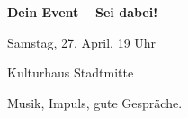 \documentclass[a5paper,12pt]{article}
\begin{document}
\begin{center}
  {\LARGE\bfseries Dein Event – Sei dabei!}
\end{center}

\vspace{1em}

\begin{multicols}{2}
  \begin{tcolorbox}[flyerstyle, title=Wann?]
    Samstag, 27. April, 19 Uhr
  \end{tcolorbox}

  \begin{tcolorbox}[flyerstyle, title=Wo?]
    Kulturhaus Stadtmitte
  \end{tcolorbox}

  \begin{tcolorbox}[flyerstyle, title=Was erwartet dich?]
    Musik, Impuls, gute Gespräche.
  \end{tcolorbox}
\end{multicols}
\end{document}
